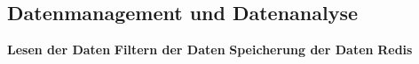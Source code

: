 \subsection{Datenmanagement und Datenanalyse}
\label{subsec:datenmanagementimpl}

\textbf{Lesen der Daten}
\textbf{Filtern der Daten}
\textbf{Speicherung der Daten}
\textbf{Redis}

\clearpage %